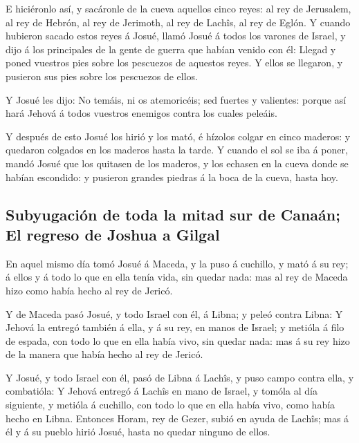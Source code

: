  E hiciéronlo así, y sacáronle de la cueva aquellos cinco
reyes: al rey de Jerusalem, al rey de Hebrón, al rey de Jerimoth, al rey
de Lachîs, al rey de Eglón.  Y cuando hubieron sacado estos
reyes á Josué, llamó Josué á todos los varones de Israel, y dijo á los
principales de la gente de guerra que habían venido con él: Llegad y
poned vuestros pies sobre los pescuezos de aquestos reyes. Y ellos se
llegaron, y pusieron sus pies sobre los pescuezos de ellos.

 Y Josué les dijo: No temáis, ni os atemoricéis; sed
fuertes y valientes: porque así hará Jehová á todos vuestros enemigos
contra los cuales peleáis.

 Y después de esto Josué los hirió y los mató, é hízolos
colgar en cinco maderos: y quedaron colgados en los maderos hasta la
tarde.  Y cuando el sol se iba á poner, mandó Josué que los
quitasen de los maderos, y los echasen en la cueva donde se habían
escondido: y pusieron grandes piedras á la boca de la cueva, hasta hoy.

\hypertarget{subyugaciuxf3n-de-toda-la-mitad-sur-de-canauxe1n-el-regreso-de-joshua-a-gilgal}{%
\subsection{Subyugación de toda la mitad sur de Canaán; El regreso de
Joshua a
Gilgal}\label{subyugaciuxf3n-de-toda-la-mitad-sur-de-canauxe1n-el-regreso-de-joshua-a-gilgal}}

 En aquel mismo día tomó Josué á Maceda, y la puso á
cuchillo, y mató á su rey; á ellos y á todo lo que en ella tenía vida,
sin quedar nada: mas al rey de Maceda hizo como había hecho al rey de
Jericó.

 Y de Maceda pasó Josué, y todo Israel con él, á Libna; y
peleó contra Libna:  Y Jehová la entregó también á ella, y
á su rey, en manos de Israel; y metióla á filo de espada, con todo lo
que en ella había vivo, sin quedar nada: mas á su rey hizo de la manera
que había hecho al rey de Jericó.

 Y Josué, y todo Israel con él, pasó de Libna á Lachîs, y
puso campo contra ella, y combatióla:  Y Jehová entregó á
Lachîs en mano de Israel, y tomóla al día siguiente, y metióla á
cuchillo, con todo lo que en ella había vivo, como había hecho en Libna.
 Entonces Horam, rey de Gezer, subió en ayuda de Lachîs;
mas á él y á su pueblo hirió Josué, hasta no quedar ninguno de ellos.

